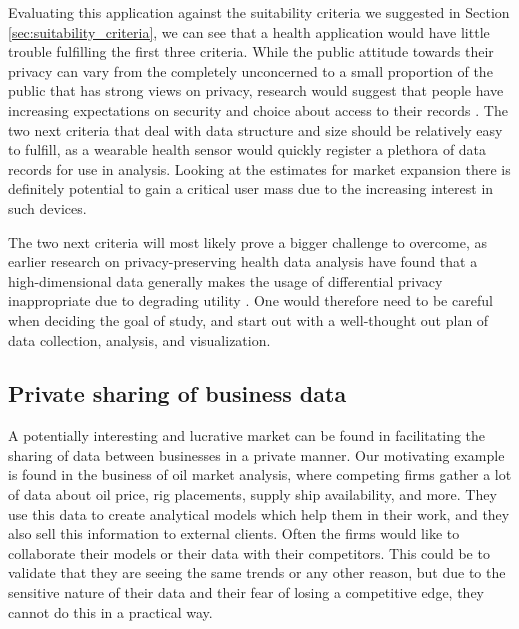 Evaluating this application against the suitability criteria we suggested in Section \ref{sec:suitability_criteria}, we can see that a health application would have little trouble fulfilling the first three criteria. While the public attitude towards their privacy can vary from the completely unconcerned to a small proportion of the public that has strong views on privacy, research would suggest that people have increasing expectations on security and choice about access to their records \citep{singleton2008public}. The two next criteria that deal with data structure and size should be relatively easy to fulfill, as a wearable health sensor would quickly register a plethora of data records for use in analysis. Looking at the estimates for market expansion there is definitely potential to gain a critical user mass due to the increasing interest in such devices.

The two next criteria will most likely prove a bigger challenge to overcome, as earlier research on privacy-preserving health data analysis have found that a high-dimensional data generally makes the usage of differential privacy inappropriate due to degrading utility \citep{gardner2013share,mohammed2013privacy}. One would therefore need to be careful when deciding the goal of study, and start out with a well-thought out plan of data collection, analysis, and visualization.  

%
%
%

\subsection{Private sharing of business data}
A potentially interesting and lucrative market can be found in facilitating the sharing of data between businesses in a private manner. Our motivating example is found in the business of oil market analysis, where competing firms gather a lot of data about oil price, rig placements, supply ship availability, and more. They use this data to create analytical models which help them in their work, and they also sell this information to external clients. Often the firms would like to collaborate their models or their data with their competitors. This could be to validate that they are seeing the same trends or any other reason, but due to the sensitive nature of their data and their fear of losing a competitive edge, they cannot do this in a practical way. 

